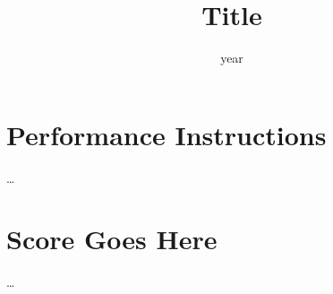 \documentclass[a4paper]{style/score-personal}
\begin{document}
	\title{Title}
	\date{year}

	\maketitle
	\emptypage{}

	\section*{Performance Instructions}
	\dots

	\newpage
	\section*{Score Goes Here}
	\dots
	\emptypage{}
	\finalpage{}
\end{document}
